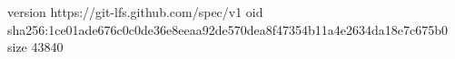 version https://git-lfs.github.com/spec/v1
oid sha256:1ce01ade676c0c0de36e8eeaa92de570dea8f47354b11a4e2634da18e7c675b0
size 43840
